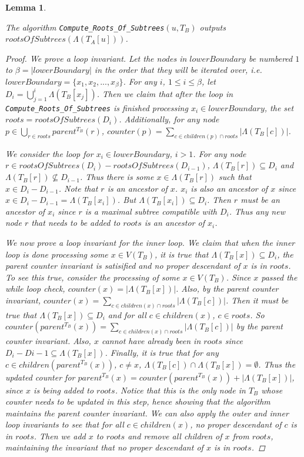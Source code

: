 \documentclass{article}
\newcommand{\leafset}{\Lambda}
\newtheorem{computerootsofsubtreescorrectness}[incompatibility]{Lemma}
\begin{document}
    \begin{computerootsofsubtreescorrectness}
        \label{lem:computerootsofsubtreescorrectness}

        The algorithm \texttt{Compute\_Roots\_Of\_Subtrees}$(u, T_B)$ outputs $rootsOfSubtrees(\leafset(T_A[u]))$.

        \begin{proof}
            We prove a loop invariant. Let the nodes in $lowerBoundary$ be numbered $1$ to $\beta = |lowerBoundary|$ in the order that they will be iterated over, i.e. $lowerBoundary = \{x_1, x_2, ..., x_{\beta}\}$. For any $i$, $1 \leq i \leq \beta$, let $D_i = \bigcup_{j = 1}^{i} \leafset(T_B[x_j])$. Then we claim that after the loop in \texttt{Compute\_Roots\_Of\_Subtrees} is finished processing $x_i \in lowerBoundary$, the set $roots = rootsOfSubtrees(D_i)$. Additionally, for any node $p \in \bigcup_{r \in roots} parent^{T_B}(r)$, $counter(p) = \sum_{c \in children(p) \cap roots} |\leafset(T_B[c])|$.

            We consider the loop for $x_i \in lowerBoundary$, $i > 1$. For any node $r \in rootsOfSubtrees(D_i) - rootsOfSubtrees(D_{i-1})$, $\leafset(T_B[r]) \subseteq D_i$ and $\leafset(T_B[r]) \not\subseteq D_{i-1}$. Thus there is some $x \in \leafset(T_B[r])$ such that $x \in D_i - D_{i-1}$. Note that $r$ is an ancestor of $x$. $x_i$ is also an ancestor of $x$ since $x \in D_i - D_{i-1} = \leafset(T_B[x_i])$. But $\leafset(T_B[x_i]) \subseteq D_i$. Then $r$ must be an ancestor of $x_i$ since $r$ is a maximal subtree compatible with $D_i$. Thus any new node $r$ that needs to be added to $roots$ is an ancestor of $x_i$.

            We now prove a loop invariant for the inner loop. We claim that when the inner loop is done processing some $x \in V(T_B)$, it is true that $\leafset(T_B[x]) \subseteq D_i$, the parent counter invariant is satisified and no proper descendant of $x$ is in $roots$. To see this true, consider the processing of some $x \in V(T_B)$. Since $x$ passed the while loop check, $counter(x) = |\leafset(T_B[x])|$. Also, by the parent counter invariant, $counter(x) = \sum_{c \in children(x) \cap roots} |\leafset(T_B[c])|$. Then it must be true that $\leafset(T_B[x]) \subseteq D_i$ and for all $c \in children(x)$, $c \in roots$. So $counter(parent^{T_B}(x)) = \sum_{c \in children(x) \cap roots} |\leafset(T_B[c])|$ by the parent counter invariant. Also, $x$ cannot have already been in $roots$ since $D_i - D{i-1} \subseteq \leafset(T_B[x])$. Finally, it is true that for any $c \in children(parent^{T_B}(x))$, $c \neq x$, $\leafset(T_B[c]) \cap \leafset(T_B[x]) = \emptyset$. Thus the updated counter for $parent^{T_B}(x) = counter(parent^{T_B}(x)) + |\leafset(T_B[x])|$, since $x$ is being added to $roots$. Notice that this is the only node in $T_B$ whose counter needs to be updated in this step, hence showing that the algorithm maintains the parent counter invariant. We can also apply the outer and inner loop invariants to see that for all $c \in children(x)$, no proper descendant of $c$ is in $roots$. Then we add $x$ to $roots$ and remove all children of $x$ from $roots$, maintaining the invariant that no proper descendant of $x$ is in $roots$.


\end{proof}
\end{computerootsofsubtreescorrectness}
\end{document}
